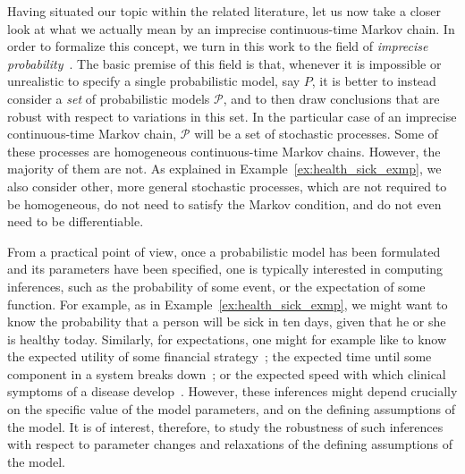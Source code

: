 \documentclass[10pt,a4paper]{paper}
\theoremstyle{definition}
\begin{document}







Having situated our topic within the related literature, let us now take a closer look at what we actually mean by an imprecise continuous-time Markov chain.
In order to formalize this concept, we turn in this work to the field of \emph{imprecise probability}~\cite{Walley:1991vk,troffaes2013:lp,augustin2013:itip}. The basic premise of this field is that, whenever it is impossible or unrealistic to specify a single probabilistic model, say $P$, it is better to instead consider a \emph{set} of probabilistic models $\mathcal{P}$, and to then draw conclusions that are robust with respect to variations in this set. In the particular case of an imprecise continuous-time Markov chain, $\mathcal{P}$ will be a set of stochastic processes. Some of these processes are homogeneous continuous-time Markov chains. However, the majority of them are not. As explained in Example~\ref{ex:health_sick_exmp}, we also consider other, more general stochastic processes, which are not required to be homogeneous, do not need to satisfy the Markov condition, and do not even need to be differentiable.


From a practical point of view, once a probabilistic model has been formulated and its parameters have been specified, one is typically interested in computing inferences, such as the probability of some event, or the expectation of some function. For example, as in Example~\ref{ex:health_sick_exmp}, we might want to know the probability that a person will be sick in ten days, given that he or she is healthy today.
Similarly, for expectations, one might for example like to know the expected utility of some financial strategy~\cite{sass2004optimizing}; the expected time until some component in a system breaks down~\cite{besnard2010approach}; or the expected speed with which clinical symptoms of a disease develop~\cite{duffy1995estimation}. However, these inferences might depend crucially on the specific value of the model parameters, and on the defining assumptions of the model.
It is of interest, therefore, to study the robustness of such inferences with respect to parameter changes and relaxations of the defining assumptions of the model.
\end{document}
